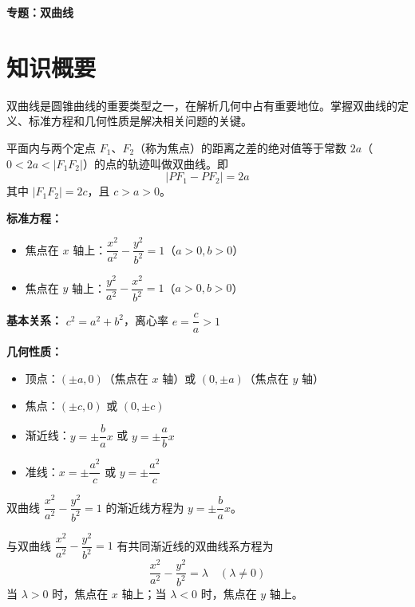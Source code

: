 \documentclass[11pt]{ctexrep}
\begin{document}
\begin{center}
    {\LARGE\bfseries 专题：双曲线}
\end{center}

\section*{知识概要}

双曲线是圆锥曲线的重要类型之一，在解析几何中占有重要地位。掌握双曲线的定义、标准方程和几何性质是解决相关问题的关键。

\begin{definition}[双曲线的定义]
    平面内与两个定点 $F_1$、$F_2$（称为焦点）的距离之差的绝对值等于常数 $2a$（$0 < 2a < |F_1F_2|$）的点的轨迹叫做双曲线。即
    \[
        |PF_1 - PF_2| = 2a
    \]
    其中 $|F_1F_2| = 2c$，且 $c > a > 0$。
\end{definition}

\begin{property}[标准方程与几何性质]
    \textbf{标准方程：}
    \begin{itemize}
        \item 焦点在 $x$ 轴上：$\dfrac{x^2}{a^2} - \dfrac{y^2}{b^2} = 1$（$a > 0, b > 0$）
        \item 焦点在 $y$ 轴上：$\dfrac{y^2}{a^2} - \dfrac{x^2}{b^2} = 1$（$a > 0, b > 0$）
    \end{itemize}
    
    \textbf{基本关系：} $c^2 = a^2 + b^2$，离心率 $e = \dfrac{c}{a} > 1$
    
    \textbf{几何性质：}
    \begin{itemize}
        \item 顶点：$(\pm a, 0)$（焦点在 $x$ 轴）或 $(0, \pm a)$（焦点在 $y$ 轴）
        \item 焦点：$(\pm c, 0)$ 或 $(0, \pm c)$
        \item 渐近线：$y = \pm \dfrac{b}{a}x$ 或 $y = \pm \dfrac{a}{b}x$
        \item 准线：$x = \pm \dfrac{a^2}{c}$ 或 $y = \pm \dfrac{a^2}{c}$
    \end{itemize}
\end{property}

\begin{property}[渐近线性质]
    双曲线 $\dfrac{x^2}{a^2} - \dfrac{y^2}{b^2} = 1$ 的渐近线方程为 $y = \pm \dfrac{b}{a}x$。
    
    与双曲线 $\dfrac{x^2}{a^2} - \dfrac{y^2}{b^2} = 1$ 有共同渐近线的双曲线系方程为
    \[
        \frac{x^2}{a^2} - \frac{y^2}{b^2} = \lambda \quad (\lambda \neq 0)
    \]
    当 $\lambda > 0$ 时，焦点在 $x$ 轴上；当 $\lambda < 0$ 时，焦点在 $y$ 轴上。
\end{property}
\end{document}
